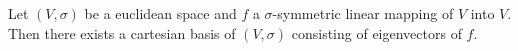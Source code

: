 Let $(V, \sigma)$ be a euclidean space and $f$ a $\sigma$-symmetric linear mapping of $V$ into $V$. Then there exists a cartesian basis of $(V, \sigma)$ consisting of eigenvectors of $f$.
